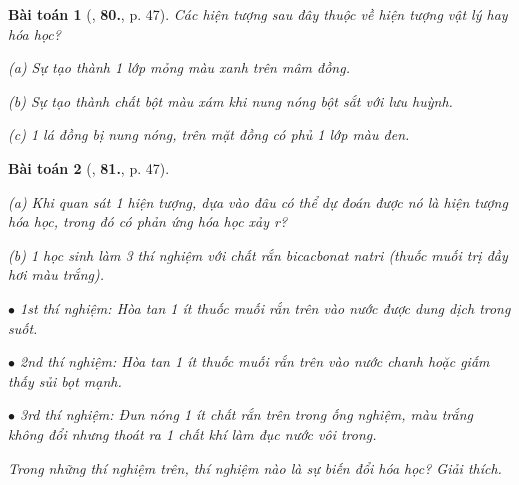 \documentclass{article}
\numberwithin{equation}{section}
\newtheorem{baitoan}{Bài toán}
\begin{document}
\begin{baitoan}[\cite{An_400_BT_Hoa_Hoc_8_2020}, \textbf{80.}, p. 47]
	Các hiện tượng sau đây thuộc về hiện tượng vật lý hay hóa học?
	\begin{enumerate*}
		\item[(a)] Sự tạo thành 1 lớp mỏng màu xanh trên mâm đồng.
		\item[(b)] Sự tạo thành chất bột màu xám khi nung nóng bột sắt với lưu huỳnh.
		\item[(c)] 1 lá đồng bị nung nóng, trên mặt đồng có phủ 1 lớp màu đen.
	\end{enumerate*}
\end{baitoan}

\begin{baitoan}[\cite{An_400_BT_Hoa_Hoc_8_2020}, \textbf{81.}, p. 47]
	\begin{enumerate*}
		\item[(a)] Khi quan sát 1 hiện tượng, dựa vào đâu có thể dự đoán được nó là hiện tượng hóa học, trong đó có phản ứng hóa học xảy r?
		\item[(b)] 1 học sinh làm 3 thí nghiệm với chất rắn bicacbonat natri \emph{} (thuốc muối trị đầy hơi màu trắng).
		\begin{enumerate*}
			\item[$\bullet$] 1st thí nghiệm: Hòa tan 1 ít thuốc muối rắn trên vào nước được dung dịch trong suốt.
			\item[$\bullet$] 2nd thí nghiệm: Hòa tan 1 ít thuốc muối rắn trên vào nước chanh hoặc giấm thấy sủi bọt mạnh.
			\item[$\bullet$] 3rd thí nghiệm: Đun nóng 1 ít chất rắn trên trong ống nghiệm, màu trắng không đổi nhưng thoát ra 1 chất khí làm đục nước vôi trong.
		\end{enumerate*}
		Trong những thí nghiệm trên, thí nghiệm nào là sự biến đổi hóa học? Giải thích.
	\end{enumerate*}
\end{baitoan}

\end{document}
